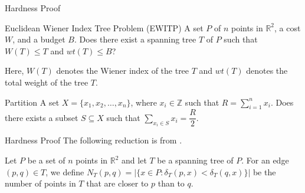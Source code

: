 \documentclass[11pt]{beamer}
\begin{document}
\begin{frame}{Hardness Proof}
	\begin{decisionblock}{Euclidean Wiener Index Tree Problem (EWITP)}
		{A set $P$ of $n$ points in $\mathbb{R}^2$, a cost $W$, and a budget $B$.}
		{Does there exist a spanning tree $T$ of $P$ such that $W(T) \leq T$ and $wt(T) \leq B$?}
	\end{decisionblock}

	Here, $W(T)$ denotes the Wiener index of the tree $T$ and $wt(T)$ denotes the total weight of the tree $T$.

	\begin{decisionblock}{Partition}
		{A set $X = \{x_1, x_2, \dots, x_n\}$, where $x_i \in \mathbb{Z}$ such that $R = \displaystyle\sum_{i = 1}^{n}x_i$.}
		{Does there exists a subset $S \subseteq X$ such that $\displaystyle\sum_{x_i \in S}x_i = \dfrac{R}{2}$.}
	\end{decisionblock}
\end{frame}

\begin{frame}{Hardness Proof}
	The following reduction is from \cite{article:geometric_spanning_trees_minimizing_wiener_index}.
	\begin{definition}
		Let $P$ be a set of $n$ points in $\mathbb{R}^2$ and let $T$ be a spanning tree of $P$.
		For an edge $(p, q) \in T$, we define $N_T(p, q) = |\{x\in P: \delta_T(p, x) < \delta_T(q,x)\}|$ be the number of points in $T$ that are closer to $p$ than to $q$.
	\end{definition}
\end{frame}
\end{document}
